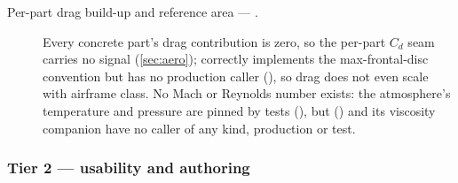 \begin{description}
  \item[Per-part drag build-up and reference area --- \fpartial.] Every concrete part's drag
  contribution is zero, so the per-part $C_d$ seam carries no signal (\cref{sec:aero});
   correctly implements the max-frontal-disc convention
  but has no production caller (), so drag does not even scale with
  airframe class. No Mach or Reynolds number exists: the atmosphere's temperature and pressure are
  pinned by tests (), but
   () and its
  viscosity companion have no caller of any kind, production or test.

\end{description}

\subsubsection*{Tier 2 --- usability and authoring}

